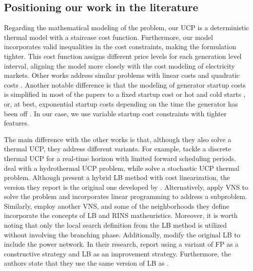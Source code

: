 
\subsection{Positioning our work in the literature}

Regarding the mathematical modeling of the problem, our UCP is a deterministic thermal model with a staircase cost function. 
Furthermore, our model incorporates valid inequalities in the cost constraints, making the formulation tighter.
This cost function assigns different price levels for each generation level interval, 
aligning the model more closely with the cost modeling of electricity markets. 
Other works address similar problems with linear costs \citet{Saboia2016,Dupin2016,Dupin2018,Harjunkoski2021} and quadratic costs \citet{Fayzur2014,Todosijevic2016}.
Another notable difference is that the modeling of generator startup costs is simplified in most of the papers to a fixed startup cost \citet{Dupin2016,Dupin2018,Santos2020,Harjunkoski2021} 
or hot and cold starts \citet{Fayzur2014,Todosijevic2016}, or, at best, exponential startup costs depending on the time the generator has been off \citet{Saboia2016}. 
In our case, we use variable startup cost constraints \citet{Morales-Espania2013} with tighter features.

The main difference with the other works is that, although they also solve a thermal UCP, they address different variants. 
For example, \citet{Dupin2016,Dupin2018} tackle a discrete thermal UCP for a real-time horizon with limited forward scheduling periods. 
\cite{Santos2020} deal with a hydrothermal UCP problem, while \citet{Saboia2016} solve a stochastic UCP thermal problem. 
Although \citet{Fayzur2014} present a hybrid LB method with cost linearization, the version they report is the original one developed by \citet{Fischetti2003}. 
Alternatively, \citet{Todosijevic2016} apply VNS to solve the problem and incorporates linear programming to address a subproblem. 
Similarly, \citet{Dupin2016} employ another VNS, and some of the neighborhoods they define incorporate the concepts of LB and RINS matheuristics. 
Moreover, it is worth noting that only the local search definition from the LB method is utilized without involving the branching phase. 
Additionally, \citet{Saboia2016} modify the original LB to include the power network.  
%
In their research, \citet{Santos2020} report using a variant of FP as a constructive strategy and LB as an improvement strategy. 
Furthermore, the authors state that they use the same version of LB as \citet{Saboia2016}.

